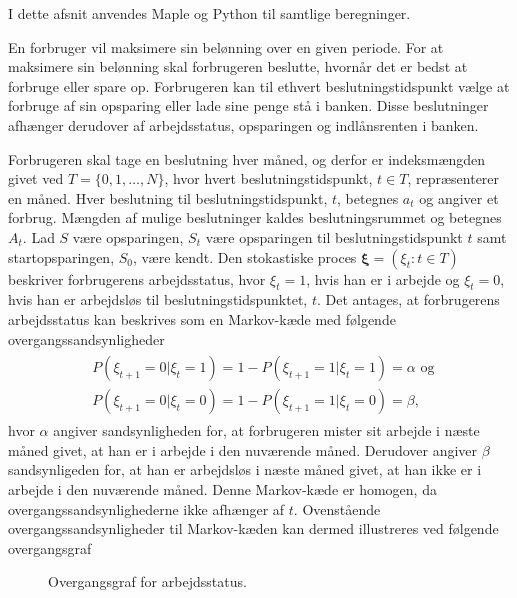 I dette afsnit anvendes Maple og Python til samtlige beregninger.

En forbruger vil maksimere sin belønning over en given periode. For at maksimere sin belønning skal forbrugeren beslutte, hvornår det er bedst at forbruge eller spare op. Forbrugeren kan til ethvert beslutningstidspunkt vælge at forbruge af sin opsparing eller lade sine penge stå i banken. Disse beslutninger afhænger derudover af arbejdsstatus, opsparingen og indlånsrenten i banken.

Forbrugeren skal tage en beslutning hver måned, og derfor er indeksmængden givet ved $T=\{0, 1, \ldots, N\}$, hvor hvert beslutningstidspunkt, $t\in T$, repræsenterer en måned. 
Hver beslutning til beslutningstidspunkt, $t$, betegnes $a_t$ og angiver et forbrug. Mængden af mulige beslutninger kaldes beslutningsrummet og betegnes $A_t$.
Lad $S$ være opsparingen, $S_t$ være opsparingen til beslutningstidspunkt $t$ samt startopsparingen, $S_0$, være kendt. Den stokastiske proces $\bm \xi= (\xi_t : t \in T)$ beskriver forbrugerens arbejdsstatus, hvor $\xi_t=1$, hvis han er i arbejde og $\xi_t=0$, hvis han er arbejdsløs til beslutningstidspunktet, $t$. Det antages, at forbrugerens arbejdsstatus kan beskrives som en Markov-kæde med følgende overgangssandsynligheder
\begin{align}\label{eq:markov_kæde_problem}
\begin{split}
    &P(\xi_{t+1}=0|\xi_t=1)=1-P(\xi_{t+1}=1|\xi_t=1)=\alpha \text{ og }\\
    &P(\xi_{t+1}=0|\xi_t=0)=1-P(\xi_{t+1}=1|\xi_t=0)=\beta,
    \end{split}
\end{align}
hvor $\alpha$ angiver sandsynligheden for, at forbrugeren mister sit arbejde i næste måned givet, at han er i arbejde i den nuværende måned. Derudover angiver $\beta$ sandsynligeden for, at han er arbejdsløs i næste måned givet, at han ikke er i arbejde i den nuværende måned. Denne Markov-kæde er homogen, da overgangssandsynlighederne ikke afhænger af $t$. Ovenstående overgangssandsynligheder til Markov-kæden kan dermed illustreres ved følgende overgangsgraf
\begin{figure}[H]
    \centering
    \caption{Overgangsgraf for arbejdsstatus.}
    \label{fig:overgangsgraf_for_arbejdsstatus}
\end{figure}

